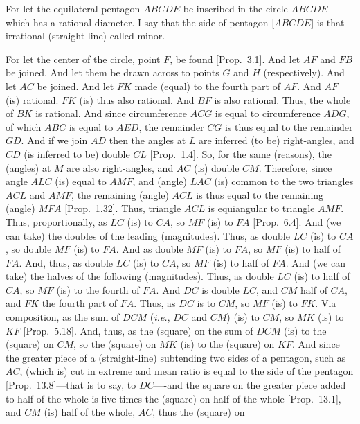 \begin{Parallel}{}{}
{\epsfysize=2.5in
\centerline{}

For let the equilateral pentagon $ABCDE$ be inscribed  in the circle $ABCDE$ which has a rational diameter. I say that the side of pentagon
[$ABCDE$] is that irrational (straight-line) called minor.

For let the center of the circle, point $F$, be found [Prop.~3.1].
And let $AF$ and $FB$ be joined. And let them be drawn
across to points $G$ and $H$ (respectively). And let $AC$ be joined.
And let $FK$ made (equal) to the fourth part of $AF$. And $AF$ (is) rational. $FK$ (is) thus also rational. And $BF$ is also rational. Thus,
the whole of $BK$ is rational. And since circumference $ACG$ is equal
to circumference $ADG$, of which $ABC$ is equal to $AED$, the
remainder $CG$ is thus equal to the remainder $GD$.
And if we join $AD$ then the angles at $L$ are inferred (to be) right-angles, 
and $CD$ (is inferred to be) double $CL$ [Prop.~1.4].  So, for the same (reasons), 
the (angles) at $M$ are also right-angles, and $AC$ (is) double $CM$. Therefore,
since angle $ALC$ (is) equal to $AMF$, and (angle) $LAC$ (is) common
to the two triangles $ACL$ and $AMF$, the remaining (angle) $ACL$ is thus
equal to the remaining (angle) $MFA$ [Prop.~1.32]. Thus, triangle 
$ACL$  is equiangular to triangle $AMF$. Thus, proportionally, 
as $LC$ (is) to $CA$, so $MF$ (is) to $FA$ [Prop.~6.4]. And (we can take) the
doubles of the leading (magnitudes). Thus, as double $LC$ (is) to $CA$,
so double $MF$ (is) to $FA$. And as double $MF$ (is) to $FA$, so
$MF$ (is) to half of $FA$. And, thus, as double $LC$ (is) to $CA$,
so $MF$ (is) to half of $FA$. And (we can take) the halves of the following
(magnitudes). Thus, as double $LC$ (is) to half of $CA$, so $MF$
(is) to the fourth of $FA$. And $DC$ is double $LC$, and  $CM$ half
of $CA$, and $FK$ the fourth part of $FA$.  Thus, as $DC$
is to $CM$, so $MF$ (is) to $FK$. Via composition, as the
sum of $DCM$ ({\em i.e.}, $DC$ and $CM$)
(is) to $CM$, so $MK$ (is) to $KF$ [Prop.~5.18]. And, thus, as the (square) on the
sum of $DCM$ (is) to the (square) on $CM$, so the (square) on $MK$
(is) to the (square) on $KF$. And since the
greater piece of a (straight-line) subtending two sides of a
pentagon, such as $AC$, (which is) cut in extreme and mean ratio is equal to the side of the pentagon [Prop.~13.8]---that is to say,
to $DC$----and the square on the greater piece added to half of the
whole is five times the (square) on half of the whole [Prop.~13.1], 
and $CM$ (is) half of the whole, $AC$, thus the (square) on
}
\end{Parallel}
